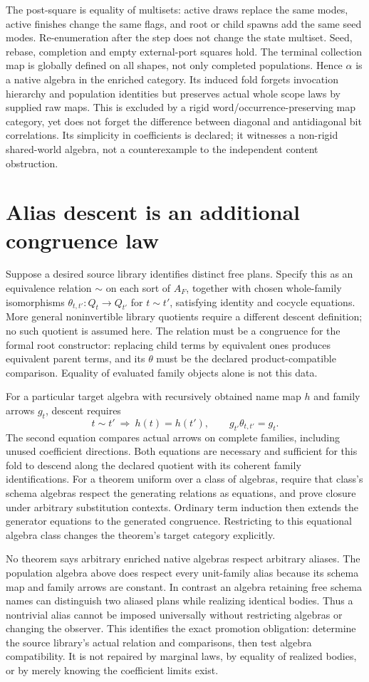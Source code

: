 \documentclass[11pt]{article}
\begin{document}
The post-square is equality of multisets: active draws replace the same modes, active finishes change the same flags, and root or child spawns add the same seed modes. Re-enumeration after the step does not change the state multiset. Seed, rebase, completion and empty external-port squares hold. The terminal collection map is globally defined on all shapes, not only completed populations. Hence $\alpha$ is a native algebra in the enriched category. Its induced fold forgets invocation hierarchy and population identities but preserves actual whole scope laws by supplied raw maps. This is excluded by a rigid word/occurrence-preserving map category, yet does not forget the difference between diagonal and antidiagonal bit correlations. Its simplicity in coefficients is declared; it witnesses a non-rigid shared-world algebra, not a counterexample to the independent content obstruction.

\section{Alias descent is an additional congruence law}
Suppose a desired source library identifies distinct free plans. Specify this as an equivalence relation $\sim$ on each sort of $A_F$, together with chosen whole-family isomorphisms $\theta_{t,t'}:Q_t\to Q_{t'}$ for $t\sim t'$, satisfying identity and cocycle equations. More general noninvertible library quotients require a different descent definition; no such quotient is assumed here. The relation must be a congruence for the formal root constructor: replacing child terms by equivalent ones produces equivalent parent terms, and its $\theta$ must be the declared product-compatible comparison. Equality of evaluated family objects alone is not this data.

For a particular target algebra with recursively obtained name map $h$ and family arrows $g_t$, descent requires
\[
 t\sim t'\ \Longrightarrow\ h(t)=h(t'),\qquad
 g_{t'}\theta_{t,t'}=g_t.
\]
The second equation compares actual arrows on complete families, including unused coefficient directions. Both equations are necessary and sufficient for this fold to descend along the declared quotient with its coherent family identifications. For a theorem uniform over a class of algebras, require that class's schema algebras respect the generating relations as equations, and prove closure under arbitrary substitution contexts. Ordinary term induction then extends the generator equations to the generated congruence. Restricting to this equational algebra class changes the theorem's target category explicitly.

No theorem says arbitrary enriched native algebras respect arbitrary aliases. The population algebra above does respect every unit-family alias because its schema map and family arrows are constant. In contrast an algebra retaining free schema names can distinguish two aliased plans while realizing identical bodies. Thus a nontrivial alias cannot be imposed universally without restricting algebras or changing the observer. This identifies the exact promotion obligation: determine the source library's actual relation and comparisons, then test algebra compatibility. It is not repaired by marginal laws, by equality of realized bodies, or by merely knowing the coefficient limits exist.
\end{document}
